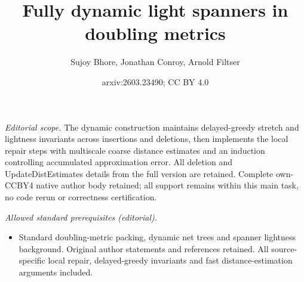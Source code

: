\documentclass[11pt]{article}
\title{Fully dynamic light spanners in doubling metrics}
\author{Sujoy Bhore, Jonathan Conroy, Arnold Filtser}
\date{arxiv:2603.23490; CC BY 4.0}
\begin{document}
\maketitle
\noindent\textit{Editorial scope.} The dynamic construction maintains delayed-greedy stretch and lightness invariants across insertions and deletions, then implements the local repair steps with multiscale coarse distance estimates and an induction controlling accumulated approximation error. All deletion and UpdateDistEstimates details from the full version are retained. Complete own-CCBY4 native author body retained; all support remains within this main task, no code rerun or correctness certification.\par\medskip
\noindent\textit{Allowed standard prerequisites (editorial).}\begin{itemize}
\item Standard doubling-metric packing, dynamic net trees and spanner lightness background. Original author statements and references retained. All source-specific local repair, delayed-greedy invariants and fast distance-estimation arguments included.
\end{itemize}\medskip
\end{document}
